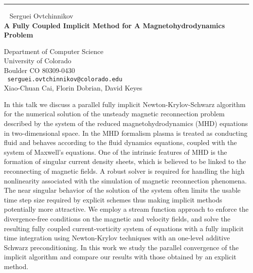 \documentclass{report}
\begin{document}
\begin{center}

\rule{6in}{1pt} \
{\large
Serguei Ovtchinnikov
\\ {\bf
A Fully Coupled Implicit Method for A Magnetohydrodynamics Problem
}}

Department of Computer Science \\
University of Colorado \\
Boulder CO 80309-0430
\\ {\tt
serguei.ovtchinnikov@colorado.edu
}
\\
Xiao-Chuan Cai,
Florin Dobrian,
David Keyes
\end{center}

In this talk we discuss a parallel fully implicit Newton-Krylov-Schwarz
algorithm for the numerical solution of the unsteady magnetic
reconnection problem described by the system of the reduced
magnetohydrodynamics (MHD) equations in two-dimensional space. In the
MHD formalism plasma is treated as conducting fluid and behaves
according to the fluid dynamics equations, coupled with the system of
Maxwell’s equations. One of the intrinsic features of MHD is
the formation of singular current density sheets, which is believed to
be linked to the reconnecting of magnetic fields. A robust solver is
required for handling the high nonlinearity associated with the
simulation of magnetic reconnection phenomena. The near singular
behavior of the solution of the system often limits the usable time
step size required by explicit schemes thus making implicit methods
potentially more attractive. We employ a stream function approach to
enforce the divergence-free conditions on the magnetic and velocity
fields, and solve the resulting fully coupled current-vorticity system
of equations with a fully implicit time integration using Newton-Krylov
techniques with an one-level additive Schwarz preconditioning. In this
work we study the parallel convergence of the implicit algorithm and
compare our results with those obtained by an explicit method.
\end{document}
